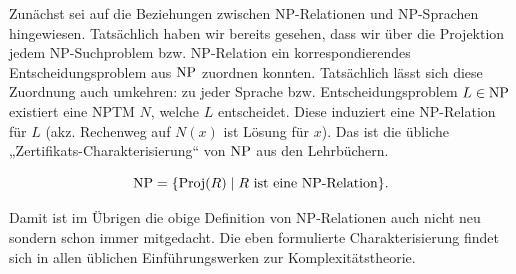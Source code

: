Zunächst sei auf die Beziehungen zwischen NP-Relationen und NP-Sprachen hingewiesen.
Tatsächlich haben wir bereits gesehen, dass wir über die Projektion jedem NP-Suchproblem bzw. NP-Relation ein korrespondierendes Entscheidungsproblem aus $\mathrm{NP}$ zuordnen konnten. Tatsächlich lässt sich diese Zuordnung auch umkehren: zu jeder Sprache bzw. Entscheidungsproblem $L\in \mathrm{NP}$ existiert eine NPTM $N$, welche $L$ entscheidet. Diese induziert eine NP-Relation für $L$ (akz. Rechenweg auf $N(x)$ ist Lösung für $x$). Das ist die übliche „Zertifikats-Charakterisierung“ von $\mathrm{NP}$ aus den Lehrbüchern.
\begin{observation}\label{obs:np-certificate-def}
\[ \mathrm{NP} = \{ \operatorname{Proj}(R) \mid \text{$R$ ist eine NP-Relation} \}.\]
\end{observation}
Damit ist im Übrigen die obige Definition von NP-Relationen auch nicht neu sondern schon immer mitgedacht. Die eben formulierte Charakterisierung findet sich in allen üblichen Einführungswerken zur Komplexitätstheorie. 


